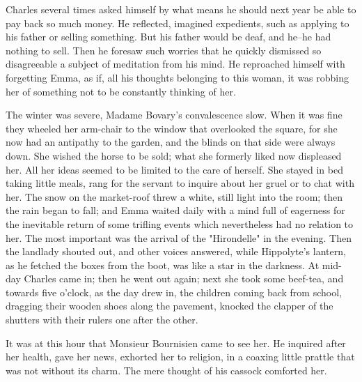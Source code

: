 \documentclass{tufte-book}
\begin{document}
Charles several times asked himself by what means he should next year be
able to pay back so much money. He reflected, imagined expedients, such
as applying to his father or selling something. But his father would be
deaf, and he--he had nothing to sell. Then he foresaw such worries that
he quickly dismissed so disagreeable a subject of meditation from
his mind. He reproached himself with forgetting Emma, as if, all his
thoughts belonging to this woman, it was robbing her of something not to
be constantly thinking of her.

The winter was severe, Madame Bovary's convalescence slow. When it
was fine they wheeled her arm-chair to the window that overlooked the
square, for she now had an antipathy to the garden, and the blinds on
that side were always down. She wished the horse to be sold; what she
formerly liked now displeased her. All her ideas seemed to be limited to
the care of herself. She stayed in bed taking little meals, rang for the
servant to inquire about her gruel or to chat with her. The snow on
the market-roof threw a white, still light into the room; then the rain
began to fall; and Emma waited daily with a mind full of eagerness for
the inevitable return of some trifling events which nevertheless had no
relation to her. The most important was the arrival of the "Hirondelle"
in the evening. Then the landlady shouted out, and other voices
answered, while Hippolyte's lantern, as he fetched the boxes from the
boot, was like a star in the darkness. At mid-day Charles came in;
then he went out again; next she took some beef-tea, and towards five
o'clock, as the day drew in, the children coming back from school,
dragging their wooden shoes along the pavement, knocked the clapper of
the shutters with their rulers one after the other.

It was at this hour that Monsieur Bournisien came to see her. He
inquired after her health, gave her news, exhorted her to religion, in a
coaxing little prattle that was not without its charm. The mere thought
of his cassock comforted her.
\end{document}
